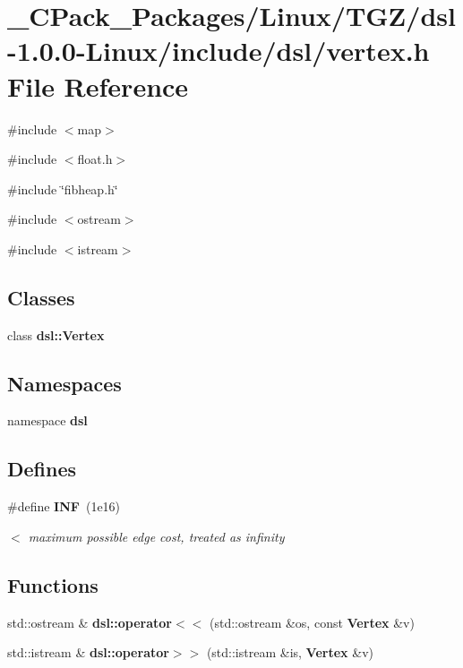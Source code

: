 \section{\_\-CPack\_\-Packages/Linux/TGZ/dsl-\/1.0.0-\/Linux/include/dsl/vertex.h File Reference}
\label{__CPack__Packages_2Linux_2TGZ_2dsl-1_80_80-Linux_2include_2dsl_2vertex_8h}
{\ttfamily \#include $<$map$>$}\par
{\ttfamily \#include $<$float.h$>$}\par
{\ttfamily \#include \char`\"{}fibheap.h\char`\"{}}\par
{\ttfamily \#include $<$ostream$>$}\par
{\ttfamily \#include $<$istream$>$}\par
\subsection*{Classes}
\begin{DoxyCompactItemize}
\item 
class {\bf dsl::Vertex}
\end{DoxyCompactItemize}
\subsection*{Namespaces}
\begin{DoxyCompactItemize}
\item 
namespace {\bf dsl}
\end{DoxyCompactItemize}
\subsection*{Defines}
\begin{DoxyCompactItemize}
\item 
\#define {\bf INF}~(1e16)
\begin{DoxyCompactList}\small\item\em $<$ maximum possible edge cost, treated as infinity \item\end{DoxyCompactList}\end{DoxyCompactItemize}
\subsection*{Functions}
\begin{DoxyCompactItemize}
\item 
std::ostream \& {\bf dsl::operator$<$$<$} (std::ostream \&os, const {\bf Vertex} \&v)
\item 
std::istream \& {\bf dsl::operator$>$$>$} (std::istream \&is, {\bf Vertex} \&v)
\end{DoxyCompactItemize}


